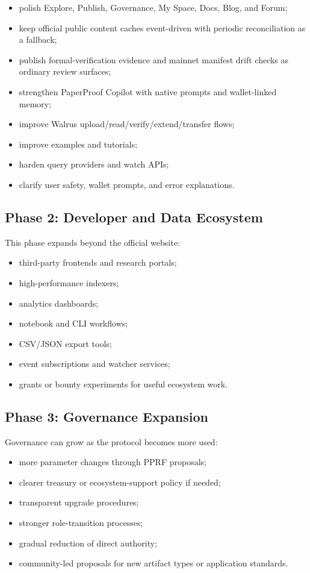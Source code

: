 \documentclass[11pt]{article}
\begin{document}
\begin{itemize}[leftmargin=*]
  \item polish Explore, Publish, Governance, My Space, Docs, Blog, and Forum;
  \item keep official public content caches event-driven with periodic
        reconciliation as a fallback;
  \item publish formal-verification evidence and mainnet manifest drift checks
        as ordinary review surfaces;
  \item strengthen PaperProof Copilot with native prompts and wallet-linked memory;
  \item improve Walrus upload/read/verify/extend/transfer flows;
  \item improve examples and tutorials;
  \item harden query providers and watch APIs;
  \item clarify user safety, wallet prompts, and error explanations.
\end{itemize}

\subsection{Phase 2: Developer and Data Ecosystem}

This phase expands beyond the official website:

\begin{itemize}[leftmargin=*]
  \item third-party frontends and research portals;
  \item high-performance indexers;
  \item analytics dashboards;
  \item notebook and CLI workflows;
  \item CSV/JSON export tools;
  \item event subscriptions and watcher services;
  \item grants or bounty experiments for useful ecosystem work.
\end{itemize}

\subsection{Phase 3: Governance Expansion}

Governance can grow as the protocol becomes more used:

\begin{itemize}[leftmargin=*]
  \item more parameter changes through PPRF proposals;
  \item clearer treasury or ecosystem-support policy if needed;
  \item transparent upgrade procedures;
  \item stronger role-transition processes;
  \item gradual reduction of direct authority;
  \item community-led proposals for new artifact types or application standards.
\end{itemize}
\end{document}

